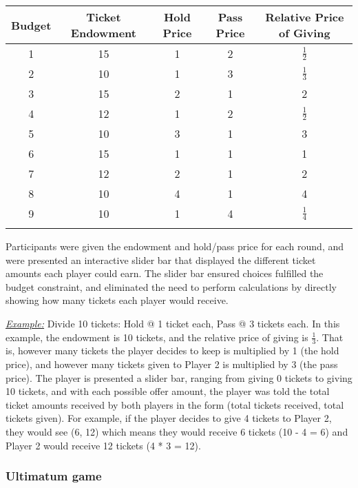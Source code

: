 \documentclass[12pt]{article}
\begin{document}
\onehalfspacing
\begin{center}
\begin{tabular}{ c c c c c }
\hline \hline
 Budget & Ticket Endowment & Hold Price & Pass Price & Relative Price of Giving \\ 
 \hline
1 & 15 & 1 & 2 & \(\frac{1}{2}\)  \\  
2 & 10 & 1 & 3 & \(\frac{1}{3}\)  \\  
3 & 15 & 2 & 1 & 2 \\  
4 & 12 & 1 & 2 & \(\frac{1}{2}\)  \\  
5 & 10 & 3 & 1 & 3  \\  
6 & 15 & 1 & 1 & 1  \\  
7 & 12 & 2 & 1 & 2 \\  
8 & 10 & 4 & 1 & 4 \\  
9 & 10 & 1 & 4 & \(\frac{1}{4}\)  \\ 
\hline \hline \\
\end{tabular}
\end{center}

\doublespacing
Participants were given the endowment and hold/pass price for each round, and were presented an interactive slider bar that displayed the different ticket amounts each player could earn. The slider bar ensured choices fulfilled the budget constraint, and eliminated the need to perform calculations by directly showing how many tickets each player would receive.

\underline{\textit{Example:}} Divide 10 tickets: Hold @ 1 ticket each, Pass @ 3 tickets each. In this example, the endowment is 10 tickets, and the relative price of giving is \(\frac{1}{3}\). That is, however many tickets the player decides to keep is multiplied by 1 (the hold price), and however many tickets given to Player 2 is multiplied by 3 (the pass price). The player is presented a slider bar, ranging from giving 0 tickets to giving 10 tickets, and with each possible offer amount, the player was told the total ticket amounts received by both players in the form (total tickets received, total tickets given). For example, if the player decides to give 4 tickets to Player 2, they would see (6, 12) which means they would receive 6 tickets (10 - 4 = 6) and Player 2 would receive 12 tickets (4 * 3 = 12).

\subsubsection{Ultimatum game}
\end{document}
